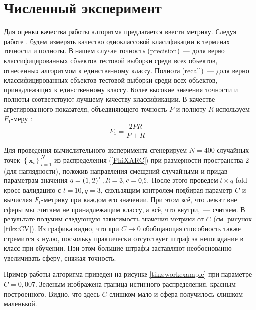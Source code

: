 \documentclass[12pt,a4paper]{article}
\newcommand\mb[1]{\ensuremath{\boldsymbol{\mathbf{#1}}}}
\newcommand\cbr[1]{\left(#1\right)} %
\newcommand\fbr[1]{\left\{#1\right\}} %
\newcommand{\T}{^{\text{\tiny\sffamily\upshape\mdseries T}}}
\begin{document}
\section{Численный эксперимент} 		 	
	Для оценки качества работы алгоритма предлагается ввести метрику. 
	Следуя работе  \cite{Romanenko2012}, будем измерять качество одноклассовой класификации в терминах точности и полноты. 
	В нашем случае точность (precision)~--- доля верно классифицированных объектов тестовой выборки среди всех объектов, отнесенных алгоритмом к единственному классу. 
	Полнота (recall)~--- доля верно классифицированных объектов тестовой выборки среди всех объектов, принадлежащих к единственному классу. 
	Более высокие значения точности и полноты соответствуют лучшему качеству классификации. 
	В качестве агрегированного показателя, объединяющего точность $P$ и полноту $R$ используем $F_1$-меру \cite{Rijsbergen1979}:
	$$F_1 = \frac{2PR}{P+R}.$$

	Для проведения вычислительного эксперимента сгенерируем $N=400$ случайных точек $\fbr{\mb x_i}_{i=1}^N$ из распределения (\ref{PhiXARC}) при размерности пространства $2$ (для наглядности), положив направления смещений случайными и придав параметрам значения $a = \cbr{1,2}\T, R = 3, c = 0{,}2.$
	После этого проведем $t{\times}q$-fold кросс-валидацию с $t = 10, q = 3$, скользящим контролем подбирая параметр $C$ и вычисляя $F_1$-метрику при каждом его значении. При этом всё, что лежит вне сферы мы считаем не принадлежащим классу, а всё, что внутри,~--- считаем.
	В результате получим следующую зависимость значения метрики от $C$ (см. рисунок \ref{tikz:CV}).
	Из графика видно, что при $C\to 0$ обобщающая способность также стремится к нулю, поскольку практически отсутствует штраф за непопадание в класс при обучении. 
	При этом большие штрафы заставляют необоснованно увеличивать сферу, снижая точность.

	Пример работы алгоритма приведен на рисунке \ref{tikz:workexample} при параметре $C = 0{,}007.$ 
	Зеленым изображена граница истинного распределения, красным~--- построенного.
	Видно, что здесь $C$ слишком мало и сфера получилось слишком маленькой.
	
\end{document}
